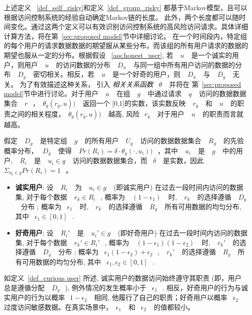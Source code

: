 上述定义 ~\ref{def_self_risky}和定义~\ref{def_group_risky} 都基于Markov模型，且可以根据访问控制系统的经验自动确定Markov链的长度。 此外，两个长度都可以随时间变化。通过这两个定义可以有效识别访问控制系统的高风险访问请求。具体详细计算方法，将在第~\ref{sec:proposed model}节中详细讨论。 在一个时间段内，特定组的每个用户的请求数据数据的期望服从某些分布，而该组的所有用户请求的数据的期望也服从一定的分布。根据假设 ~\ref{ass:honest_user}, 若 ~$~u~$~ 是一个诚实的用户，则用户 ~$~u~$~ 的访问数据的分布 ~$~D_u~$~ 与同一组中所有用户访问的数据的分布 ~$~D_g~$~ 密切相关。相反，若 ~$~u~$~ 是一个好奇的用户，则 ~$~D_u~$~ 与 ~$~D_g~$~ 无关。 为了有效描述这种关系， 引入 \emph{相关关系函数} ~$\theta~$~ 并将在 第~\ref{sec:proposed model}节中进行讨论。对于用户 ~$~u~$~ 在组 ~$~g~$~ 中通过请求 ~$~q~$~ 访问的数据数据集合 ~$~r~$~，~$\theta_g (r_q,u))~$~ 返回一个 [0,1]的实数，该实数反映 ~$~r_q~$~ 和 ~$~u~$~ 的职责之间的相关程度，~$\theta_g (r_q,u))~$~ 越高, 风险~$~r_q~$~ 对于用户 ~$~u~$~ 的职责而言就越高。


\begin{definition}%
	\label{def_curious user}
	假定 ~$~D_g~$~ 是特定组 ~$~g~$~ 的所有用户 ~$~U_g~$~ 访问的数据数据集合 ~$~R_g~$~ 的先验概率分布，~$~D_g~$~ 使得 ~$~Pr(R_i)=\delta \cdot \theta_g (\cdot,u_i))~$~，其中 ~$~u_i~$~ 是 ~$~g~$~ 中的用户, ~$~R_i~$~ 是 ~$~u_i \in g~$~ 访问的数据数据集合，而 ~$\delta~$~ 是实数，因此 ~$\Sigma_{u_i \in g}Pr(R_i) = 1~$~。
	\begin{itemize}
		\item \textbf{诚实用户}: 设 ~$~R_i~$~ 为 ~$~u_i \in g~$~ (即诚实用户) 在过去一段时间内访问的数据集, 对于每个数据 ~$~r_k \in R_i~$~, 概率为 ~$~(1-\epsilon_1)~$~ 时,  ~$~r_k~$~ 的选择遵循 ~$~D_g~$~ 分布 ; 概率为 ~$\epsilon_1~$~ 时,  ~$~r_k~$~ 的选择遵循 ~$~R_g~$~ 所有可用数据的均匀分布, 其中 ~$\epsilon_1 \in [0,1]~$~.
		\item \textbf{好奇用户}: 设 ~$~R_i'~$~ 是 ~$~u_i' \in g~$~ (即好奇用户) 在过去一段时间内访问的数据集, 对于每个数据 ~$~r_k' \in R_i'~$~, 概率为 ~$~(1-\epsilon_1)(1-\epsilon_2)~$~ 时,  ~$~r_k'~$~ 的选择遵循 ~$~D_g~$~ 分布 ; 概率为 ~$\epsilon_1 (1 - \epsilon_2)+ \epsilon_2~$~,  ~$~r_k'~$~ 的选择遵循 ~$~R_g~$~ 所有可用数据的均匀分布, 其中 ~$\epsilon_1, \epsilon_2 \in [0,1]~$~.
	\end{itemize}
\end{definition}

如定义~\ref{def_curious user} 所述, 诚实用户的数据访问始终遵守其职责 (即，用户总是遵循分配 ~$~D_g~$~), 例外情况的发生概率小于 ~$\epsilon_1~$~. 相反，好奇用户的行为与诚实用户的行为以概率~$~1-\epsilon_2~$~ 相同, 他履行了自己的职责；好奇用户以概率 ~$\epsilon_2~$~ 过度访问敏感数据。在真实场景中，~$\epsilon_1~$~ 和 ~$\epsilon_2~$~ 的值都较小。


